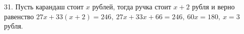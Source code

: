 31. Пусть карандаш стоит $x$ рублей, тогда ручка стоит $x+2$ рубля и верно равенство $27x+33(x+2)=246,\ 27x+33x+66=246,\ 60x=180,\ x=3$рубля.\\
